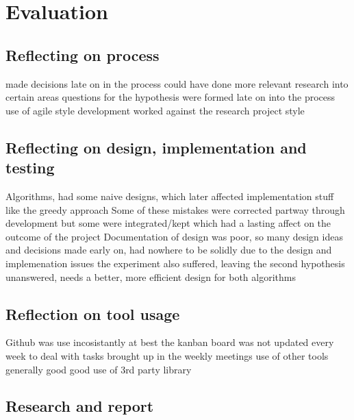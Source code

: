 \documentclass[a4paper,11pt]{article}
\begin{document}
\section{Evaluation}
\subsection{Reflecting on process}
made decisions late on in the process
could have done more relevant research into certain areas
questions for the hypothesis were formed late on into the process
use of agile style development worked against the research project style
\subsection{Reflecting on design, implementation and testing}
Algorithms, had some naive designs, which later affected implementation
stuff like the greedy approach
Some of these mistakes were corrected partway through development but some were integrated/kept which had a lasting affect on the outcome of the project
Documentation of design was poor, so many design ideas and decisions made early on, had nowhere to be solidly
due to the design and implemenation issues the experiment also suffered, leaving the second hypothesis unanswered, needs a better, more efficient design for both algorithms


\subsection{Reflection on tool usage}
Github was use incosistantly at best
the kanban board was not updated every week to deal with tasks brought up in the weekly meetings
use of other tools generally good
good use of 3rd party library
\subsection{Research and report}
\end{document}
